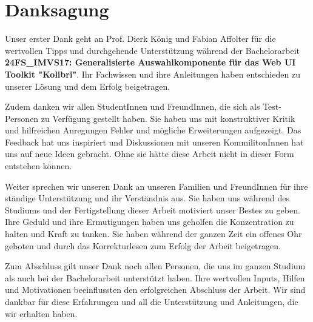 \chapter*{Danksagung}

Unser erster Dank geht an Prof. Dierk König und Fabian Affolter für die wertvollen Tipps und durchgehende Unterstützung 
während der Bachelorarbeit \textbf{24FS\_IMVS17: Generalisierte Auswahlkomponente für das Web UI Toolkit "Kolibri"}. 
Ihr Fachwissen und ihre Anleitungen haben entschieden zu unserer Lösung und dem Erfolg beigetragen. 

Zudem danken wir allen StudentInnen und FreundInnen, die sich als Test-Personen zu Verfügung gestellt haben. 
Sie haben uns mit konstruktiver Kritik und hilfreichen Anregungen Fehler und mögliche Erweiterungen aufgezeigt. 
Das Feedback hat uns inspiriert und Diskussionen mit unseren KommilitonInnen hat uns auf neue Ideen gebracht. 
Ohne sie hätte diese Arbeit nicht in dieser Form entstehen können. 

Weiter sprechen wir unseren Dank an unseren Familien und FreundInnen für ihre ständige Unterstützung und ihr Verständnis aus. 
Sie haben uns während des Studiums und der Fertigstellung dieser Arbeit motiviert unser Bestes zu geben. 
Ihre Geduld und ihre Ermutigungen haben uns geholfen die Konzentration zu halten und Kraft zu tanken. 
Sie haben während der ganzen Zeit ein offenes Ohr geboten und durch das Korrekturlesen zum Erfolg der Arbeit beigetragen. 

Zum Abschluss gilt unser Dank noch allen Personen, die uns im ganzen Studium als auch bei der Bachelorarbeit unterstützt haben. 
Ihre wertvollen Inputs, Hilfen und Motivationen beeinflussten den erfolgreichen Abschluss der Arbeit. 
Wir sind dankbar für diese Erfahrungen und all die Unterstützung und Anleitungen, die wir erhalten haben. 
